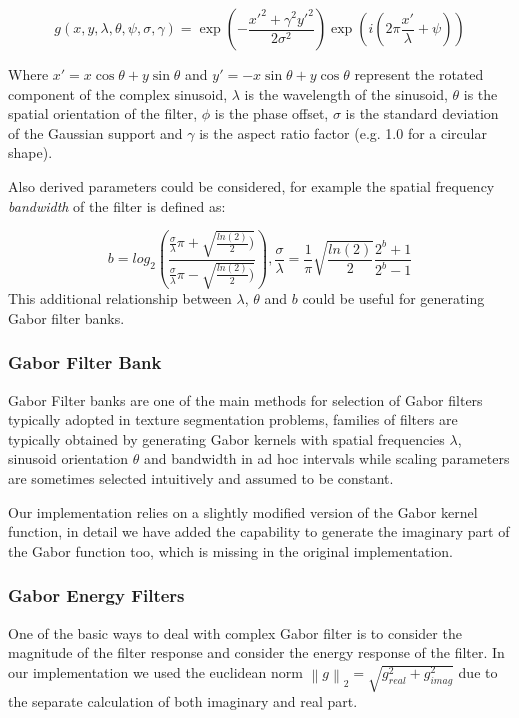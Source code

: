 \begin{equation}
g(x,y,\lambda,\theta,\psi,\sigma,\gamma) = \exp \left( - \frac{ x'^2 + \gamma^2 y'^2 }{ 2 \sigma^2} \right ) \exp \left( i \left( 2 \pi \frac{x'}{\lambda} + \psi \right ) \right )
\end{equation}

Where $x' = x \cos\theta + y \sin\theta$ and $y' = -x \sin\theta + y \cos\theta$ represent the rotated component of the complex sinusoid, $\lambda$ is the wavelength of the sinusoid, $\theta$ is the spatial orientation of the filter, $\phi$ is the phase offset, $\sigma$ is the standard deviation of the Gaussian support and $\gamma$ is the aspect ratio factor (e.g. 1.0 for a circular shape).

Also derived parameters could be considered, for example the spatial frequency \emph{bandwidth} of the filter is defined as:

\begin{equation}
b = log_2 \left ( \frac{ \frac{\sigma}{\lambda} \pi + \sqrt{ \frac{ln(2)}{2} )} }{  \frac{\sigma}{\lambda} \pi - \sqrt{ \frac{ln(2)}{2} )} } \right ),  \frac{\sigma}{\lambda} = \frac{1}{\pi} \sqrt{ \frac{ln(2)}{2} } \frac{2^b+1}{2^b-1}
\end{equation}
This additional relationship between $\lambda$, $\theta$ and $b$ could be useful for generating Gabor filter banks\cite{gaborParams}.

\subsubsection*{Gabor Filter Bank}
Gabor Filter banks are one of the main methods for selection of Gabor filters typically adopted in texture segmentation problems, families of filters are typically obtained by generating Gabor kernels with spatial frequencies $\lambda$, sinusoid orientation $\theta$ and bandwidth in ad hoc intervals while scaling parameters are sometimes selected intuitively and assumed to be constant.

Our implementation relies on a slightly modified version of the  Gabor kernel function, in detail we have added the capability to generate the imaginary part of the Gabor function too, which is missing in the original implementation.

\subsubsection*{Gabor Energy Filters}
One of the basic ways to deal with complex Gabor filter is to consider the magnitude of the filter response and consider the energy response of the filter. In our implementation we used the euclidean norm $ \left \| g \right \|_2 = \sqrt{ g_{real}^2 + g_{imag}^2 }$ due to the separate calculation of both imaginary and real part.

